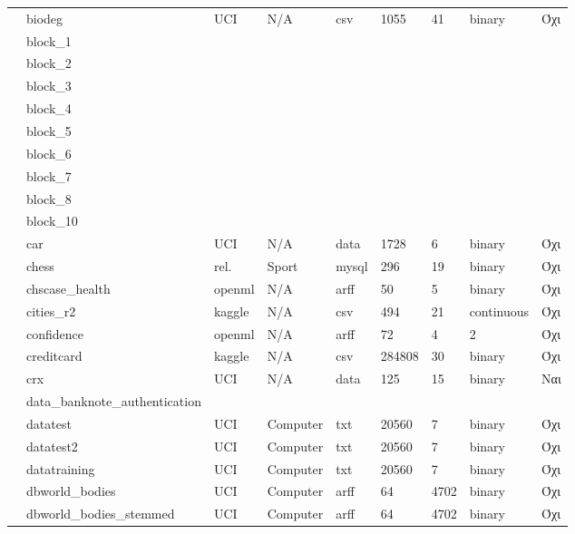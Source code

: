 {\begin{longtable}{|l| l| l | l | l | l |l | l | l | }
 							\rownumber &  biodeg \citep{biodeg} & UCI & N/A& csv &1055 & 41  & binary & Όχι \\
 							\rownumber & block\_1 & & & & & & & \\
 							\rownumber & block\_2 & & & & & & & \\
 							\rownumber & block\_3 & & & & & & & \\
 							\rownumber & block\_4 & & & & & & & \\
 							\rownumber & block\_5 & & & & & & & \\
 							\rownumber & block\_6 & & & & & & & \\
 							\rownumber & block\_7 & & & & & & & \\
 							\rownumber & block\_8 & & & & & & & \\
 							\rownumber & block\_10 & & & & & & & \\
 							\rownumber & car \citep{car} & UCI & N/A & data & 1728 & 6  & binary & Όχι\\
 							\rownumber & chess & rel. & Sport & mysql  & 296 & 19 & binary & Όχι \\
 							\rownumber & chscase\_health \citep{health} & openml & N/A & arff & 50&5 & binary & Όχι \\
 							\rownumber & cities\_r2 \citep{indian} & kaggle & N/A & csv & 494 & 21 & continuous & Όχι \\
 							\rownumber & confidence \citep{confidence}  & openml & N/A & arff & 72 & 4 &2 & Όχι \\
 							\rownumber & creditcard \citep{creditcard} & kaggle & N/A & csv & 284808 & 30 & binary & Όχι \\
 							\rownumber & crx \citep{credit}  & UCI & N/A & data & 125 & 15 & binary & Ναι \\
 							\rownumber & data\_banknote\_authentication & & & & & & & \\
 							\rownumber & datatest & UCI & Computer & txt & 20560 & 7 & binary & Όχι \\
 							\rownumber & datatest2 & UCI & Computer & txt & 20560 & 7 & binary & Όχι \\
 							\rownumber & datatraining & UCI & Computer & txt & 20560 & 7 & binary & Όχι \\
 							\rownumber & dbworld\_bodies & UCI & Computer & arff & 64 & 4702 & binary & Όχι \\
 							\rownumber & dbworld\_bodies\_stemmed & UCI & Computer & arff & 64 & 4702 & binary & Όχι \\

\end{longtable}}
